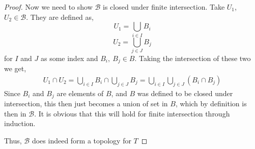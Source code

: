\documentclass[12pt]{article}
\newcommand      {\BB}        {{\mathscr B}}
\begin{document}
\begin{proof}
    Now we need to show $\BB$ is closed under finite intersection. Take $U_1$, $U_2\in \BB$. They are defined as, \[U_1 = \bigcup_{i \in I}B_i\] \[U_2 =\bigcup_{j \in J}B_j\] for $I$ and $J$ as some index and $B_i,\ B_j\in B$.
    Taking the intersection of these two we get,
    \begin{align*}
        U_1 \cap U_2 =  \bigcup_{i \in I}B_i \cap \bigcup_{j \in J}B_j =  \bigcup_{i \in I}\bigcup_{j \in J}(B_i \cap B_j)
    \end{align*}
    Since $B_i$ and $B_j$ are elements of $B$, and $B$ was defined to be closed under intersection, this then just becomes a union of set in $B$, which by definition is then in $\BB$. It is obvious that this will hold for finite intersection through induction. 

    Thus, $\BB$ does indeed form a topology for $T$
    
\end{proof}
\end{document}
